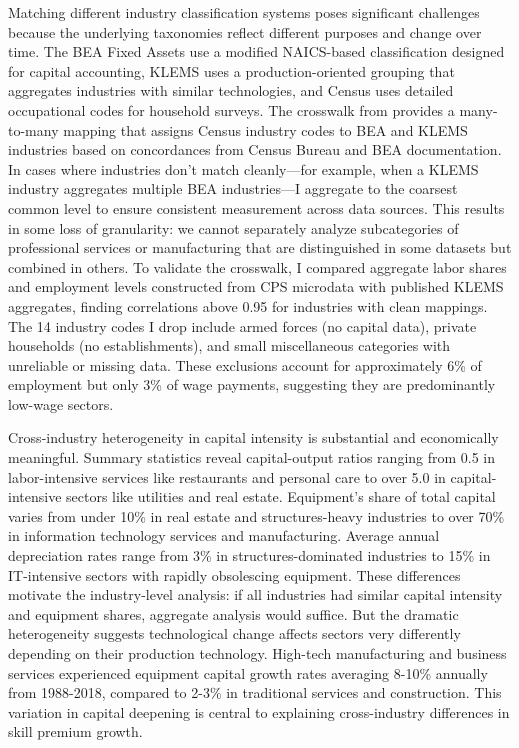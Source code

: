 \documentclass[12pt]{article}
\begin{document}
Matching different industry classification systems poses significant challenges because the underlying taxonomies reflect different purposes and change over time. The BEA Fixed Assets use a modified NAICS-based classification designed for capital accounting, KLEMS uses a production-oriented grouping that aggregates industries with similar technologies, and Census uses detailed occupational codes for household surveys. The crosswalk from \citet{acemoglu2020unpacking} provides a many-to-many mapping that assigns Census industry codes to BEA and KLEMS industries based on concordances from Census Bureau and BEA documentation. In cases where industries don't match cleanly---for example, when a KLEMS industry aggregates multiple BEA industries---I aggregate to the coarsest common level to ensure consistent measurement across data sources. This results in some loss of granularity: we cannot separately analyze subcategories of professional services or manufacturing that are distinguished in some datasets but combined in others. To validate the crosswalk, I compared aggregate labor shares and employment levels constructed from CPS microdata with published KLEMS aggregates, finding correlations above 0.95 for industries with clean mappings. The 14 industry codes I drop include armed forces (no capital data), private households (no establishments), and small miscellaneous categories with unreliable or missing data. These exclusions account for approximately 6\% of employment but only 3\% of wage payments, suggesting they are predominantly low-wage sectors.

Cross-industry heterogeneity in capital intensity is substantial and economically meaningful. Summary statistics reveal capital-output ratios ranging from 0.5 in labor-intensive services like restaurants and personal care to over 5.0 in capital-intensive sectors like utilities and real estate. Equipment's share of total capital varies from under 10\% in real estate and structures-heavy industries to over 70\% in information technology services and manufacturing. Average annual depreciation rates range from 3\% in structures-dominated industries to 15\% in IT-intensive sectors with rapidly obsolescing equipment. These differences motivate the industry-level analysis: if all industries had similar capital intensity and equipment shares, aggregate analysis would suffice. But the dramatic heterogeneity suggests technological change affects sectors very differently depending on their production technology. High-tech manufacturing and business services experienced equipment capital growth rates averaging 8-10\% annually from 1988-2018, compared to 2-3\% in traditional services and construction. This variation in capital deepening is central to explaining cross-industry differences in skill premium growth.
\end{document}
